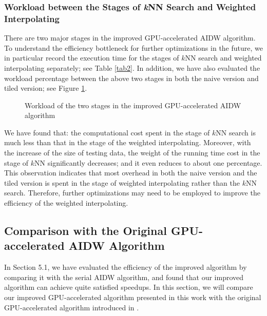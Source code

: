 \documentclass[final,5p,times,twocolumn,authoryear]{elsarticle}
\begin{document}
			\subsubsection{Workload between the Stages of \textit{k}NN Search and Weighted Interpolating}
			
			There are two major stages in the improved GPU-accelerated AIDW algorithm. 
			To understand the efficiency bottleneck for further optimizations in the 
			future, we in particular record the execution time for the stages of $k$NN 
			search and weighted interpolating separately; see Table \ref{tab2}. In addition, we 
			have also evaluated the workload percentage between the above two stages in 
			both the naive version and tiled version; see Figure \ref{fig7}.
			
\begin{figure}[h!]
				\centering
				\hspace{1em}
				\caption{ Workload of the two stages in the improved GPU-accelerated 
					AIDW algorithm}
				\label{fig7}       \end{figure}
			

			We have found that: the computational cost spent in the stage of $k$NN search 
			is much less than that in the stage of the weighted interpolating. Moreover, 
			with the increase of the size of testing data, the weight of the running 
			time cost in the stage of $k$NN significantly decreases; and it even reduces to 
			about one percentage. This observation indicates that most overhead in both 
			the naive version and the tiled version is spent in the stage of weighted 
			interpolating rather than the $k$NN search. Therefore, further optimizations 
			may need to be employed to improve the efficiency of the weighted 
			interpolating. 
			
			\subsection{Comparison with the Original GPU-accelerated AIDW Algorithm}
			In Section 5.1, we have evaluated the efficiency of the improved algorithm 
			by comparing it with the serial AIDW algorithm, and found that our improved 
			algorithm can achieve quite satisfied speedups. In this section, we will 
			compare our improved GPU-accelerated algorithm presented in this work with 
			the original GPU-accelerated algorithm introduced in \citep{29DBLP:journals/corr/MeiXX15}.
			
\end{document}
